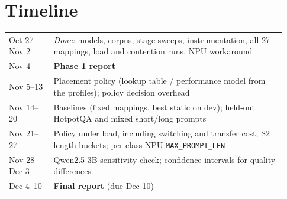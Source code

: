 \documentclass[10pt]{article}
\begin{document}
\appendix
\section{Timeline}
\begin{table}[H]\centering\small
\begin{tabular}{p{0.15\linewidth}p{0.78\linewidth}}\toprule
Oct 27--Nov 2 & \emph{Done:} models, corpus, stage sweeps, instrumentation, all 27 mappings, load and contention runs, NPU workaround\\
Nov 4 & \textbf{Phase 1 report}\\
Nov 5--13 & Placement policy (lookup table / performance model from the profiles); policy decision overhead\\
Nov 14--20 & Baselines (fixed mappings, best static on dev); held-out HotpotQA and mixed short/long prompts\\
Nov 21--27 & Policy under load, including switching and transfer cost; S2 length buckets; per-class NPU \texttt{MAX\_PROMPT\_LEN}\\
Nov 28--Dec 3 & Qwen2.5-3B sensitivity check; confidence intervals for quality differences\\
Dec 4--10 & \textbf{Final report} (due Dec 10)\\\bottomrule
\end{tabular}
\end{table}
\end{document}
